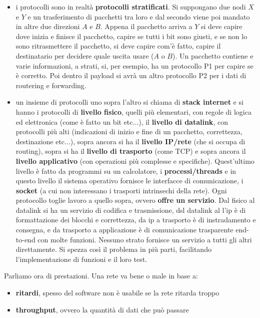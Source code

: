 \documentclass[a4paper,12pt, oneside]{book}
\begin{document}
\begin{itemize}
\item i protocolli sono in realtà \textbf{protocolli stratificati}. Si suppongano due nodi $X$ e $Y$ e un trasferimento di pacchetti tra loro e dal secondo viene poi mandato in altre due direzioni $A$ e $B$. Appena il pacchetto arriva a $Y$ si deve capire dove inizia e finisce il pacchetto, capire se tutti i bit sono giusti, e se non lo sono ritrasmettere il pacchetto, si deve capire com'è fatto, capire il destinatario per decidere quale uscita usare ($A$ o $B$). Un pacchetto contiene e varie informazioni, a strati, si, per esempio, ha un protocollo P1 per capire se è corretto. Poi dentro il payload si avrà un altro protocollo P2 per i dati di routering e forwarding. 
\item un insieme di protocolli uno sopra l'altro si chiama di \textbf{stack internet} e si hanno i protocolli di \textbf{livello fisico}, quelli più elementari, con regole di logica ed elettronica (come è fatto un bit etc...), il \textbf{livello di datalink}, con protocolli più alti (indicazioni di inizio e fine di un pacchetto, correttezza, destinazione etc...), sopra ancora si ha il \textbf{livello IP/rete} (che si occupa di routing), sopra si ha il \textbf{livello di trasporto} (come TCP) e sopra ancora il \textbf{livello applicativo} (con operazioni più complesse e specifiche). Quest'ultimo livello è fatto da programmi su un calcolatore, i \textbf{processi/threads} e in questo livello il sistema operativo fornisce le interfacce di comunicazione, i \textbf{socket} (a cui non interessano i trasporti intrinsechi della rete). Ogni protocollo toglie lavoro a quello sopra, ovvero \textbf{offre un servizio}. Dal fisico al datalink si ha un servizio di codifica e trasmissione, dsl datalink al l'ip è di formattazione dei blocchi e correttezza, da ip a trasporto è di instradamento e consegna, e da trasporto a applicazione è di comunicazione trasparente end-to-end con molte funzioni. Nessuno strato fornisce un servizio a tutti gli altri direttamente. Si spezza così il problema in più parti, facilitando l'implementazione di funzioni e il loro test. 
\end{itemize}
Parliamo ora di prestazioni. Una rete va bene o male in base a:
\begin{itemize}
\item \textbf{ritardi}, spesso del software non è usabile se la rete ritarda troppo
\item \textbf{throughput}, ovvero la quantità di dati che può passare
\end{itemize}
\end{document}
